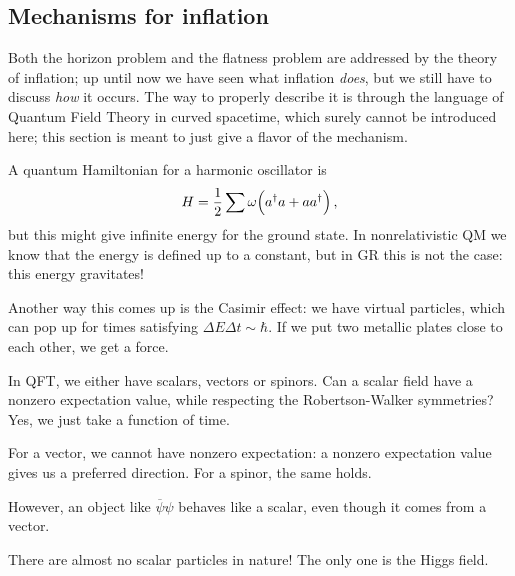 \documentclass[main.tex]{subfiles}
\begin{document}
\subsection{Mechanisms for inflation}

Both the horizon problem and the flatness problem are addressed by the theory of inflation; up until now we have seen what inflation \emph{does}, but we still have to discuss \emph{how} it occurs. 
The way to properly describe it is through the language of Quantum Field Theory in curved spacetime, which surely cannot be introduced here; this section is meant to just give a flavor of the mechanism.


A quantum Hamiltonian for a harmonic oscillator is 
%
\begin{align}
  H = \frac{1}{2} \sum \omega \qty(a ^\dag a + a a ^\dag)
\,,
\end{align}
%
but this might give infinite energy for the ground state.
In nonrelativistic QM we know that the energy is defined up to a constant, but in GR this is not the case: this energy gravitates!

Another way this comes up is the Casimir effect: we have virtual particles, which can pop up for times satisfying \(\Delta E \Delta t \sim \hbar\).
If we put two metallic plates close to each other, we get a force.

In QFT, we either have scalars, vectors or spinors.
Can a scalar field have a nonzero expectation value, while respecting the Robertson-Walker symmetries? Yes, we just take a function of time.

For a vector, we cannot have nonzero expectation: a nonzero expectation value gives us a preferred direction.
For a spinor, the same holds.

However, an object like \(\overline{\psi} \psi \) behaves like a scalar, even though it comes from a vector.

There are almost no scalar particles in nature! The only one is the Higgs field.
\end{document}
